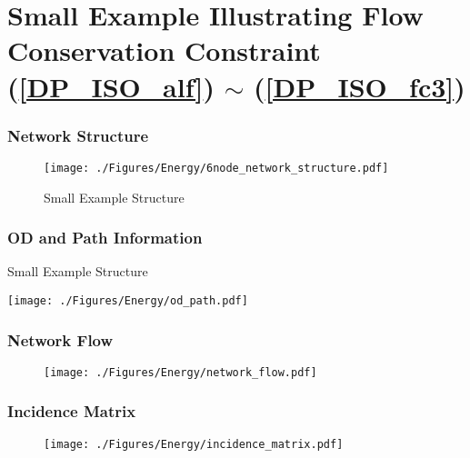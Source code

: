\chapter{Small Example Illustrating Flow Conservation Constraint (\ref{DP_ISO_alf}) $\sim$ (\ref{DP_ISO_fc3})}\label{App:flow_exam}

\subsection*{Network Structure}
 \begin{figure}[htbp]
\begin{center}
    \texttt{[image: ./Figures/Energy/6node\_network\_structure.pdf]}
\caption{Small Example Structure}
\label{fig:smal_exam_stru}
\end{center}
\end{figure}

\subsection*{OD and Path Information}
 \begin{table}[htbp]
 \caption{Small Example Structure}
 \vspace{-0.5cm}
\begin{center}
    \texttt{[image: ./Figures/Energy/od\_path.pdf]}
\label{fig:od_path}
\end{center}
\end{table}
\pagebreak
\subsection*{Network Flow}
 \begin{figure}[h]
\begin{center}
    \texttt{[image: ./Figures/Energy/network\_flow.pdf]}
\label{fig:netw_flow}
\caption*{}
\end{center}
\end{figure}
\vspace{-2cm}
\subsection*{Incidence Matrix}
 \begin{figure}[h]
\begin{center}
    \texttt{[image: ./Figures/Energy/incidence\_matrix.pdf]}
\label{fig:inci_matr}
\caption*{}
\end{center}
\end{figure}
